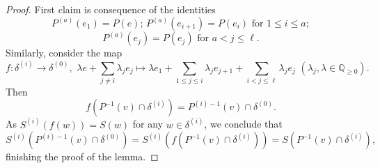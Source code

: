 \documentclass[11pt, reqno]{amsart}
\theoremstyle{plain}
\theoremstyle{definition}
\theoremstyle{remark}
\begin{document}
\begin{proof}
First claim is consequence of the identities
$$P^{(a)}(e_{1}) =  P(e);\, P^{(a)}(e_{i + 1}) =  P(e_{i}) \text{ for }1\leq i\leq a;$$
$$P^{(a)}(e_{j}) =  P(e_{j}) \text{ for } a<j\leq \ell.$$
Similarly, consider the map 
$$f: \delta^{(i)}\rightarrow \delta^{(0)},\,\, \lambda e  + \sum_{j\neq i}\lambda_{j}e_{j}\mapsto \lambda e_{1} + \sum_{1\leq j\leq i}\lambda_{j} e_{j +1} + \sum_{i< j\leq \ell}\lambda_{j}e_{j}\,\, (\lambda_{j}, \lambda\in\mathbb{Q}_{\geq 0}).$$
Then
$$f(P^{-1}(v)\cap \delta^{(i)}) =  P^{(i)-1}(v)\cap \delta^{(0)}.$$
As $S^{(i)}(f(w)) =  S(w)$ for any $w\in \delta^{(i)}$, we conclude that 
$$S^{(i)}(P^{(i)-1}(v)\cap\delta^{(0)}) =  S^{(i)}(f(P^{-1}(v)\cap \delta^{(i)})) =  S(P^{-1}(v)\cap \delta^{(i)}),$$
finishing the proof of the lemma. 
\end{proof}
\end{document}
